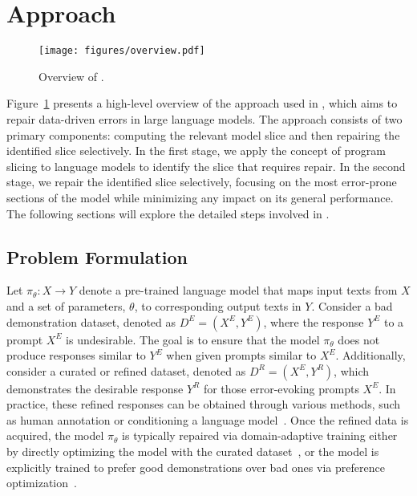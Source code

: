 \section{Approach}
\label{sec:approach}


\begin{figure}[]
	\centering
 \texttt{[image: figures/overview.pdf]}
	\vspace{-10pt}
	\caption{Overview of \nick.}
	\label{fig:overview}
\end{figure}

Figure~\ref{fig:overview} presents a high-level overview of the approach used in \nick, which aims to repair data-driven errors in large language models. The approach consists of two primary components: computing the relevant model slice and then repairing the identified slice selectively. In the first stage, we apply the concept of program slicing to language models to identify the slice that requires repair. In the second stage, we repair the identified slice selectively, focusing on the most error-prone sections of the model while minimizing any impact on its general performance. The following sections will explore the detailed steps involved in \nick.

\subsection{Problem Formulation}

Let \( \pi_\theta: X \rightarrow Y \) denote a pre-trained language model that maps input texts from \( X \) and a set of parameters, $\theta$, to corresponding output texts in \( Y \). Consider a bad demonstration dataset, denoted as \( D^E = (X^E, Y^E) \), where the response \( Y^E \) to a prompt \( X^E \) is undesirable. The goal is to ensure that the model \( \pi_\theta \) does not produce responses similar to \( Y^E \) when given prompts similar to \( X^E \). Additionally, consider a curated or refined dataset, denoted as \( D^R = (X^E, Y^R) \), which demonstrates the desirable response \( Y^R \) for those error-evoking prompts \( X^E \). In practice, these refined responses can be obtained through various methods, such as human annotation or conditioning a language model~\cite{solaiman2021process,lee2024mechanistic, wang2022exploring, pan2023automatically}. Once the refined data is acquired, the model \( \pi_\theta  \) is typically repaired via domain-adaptive training either by directly optimizing the model with the curated dataset~\cite{lee2024mechanistic,wang2022exploring,gehman2020realtoxicityprompts}, or the model is explicitly trained to prefer good demonstrations over bad ones via preference optimization~\cite{rafailov2024direct}.


